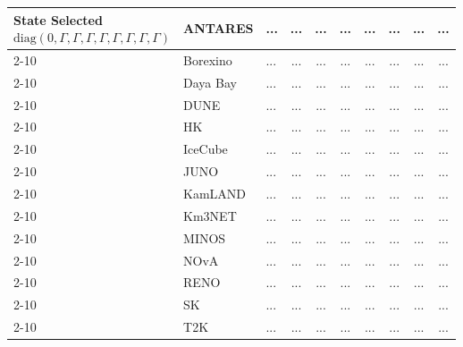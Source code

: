 \begin{table}[H]
{\begin{tabular}{|l|l|l||c|c|c|c|c|c|c|}
\multirow{13}{*}{\parbox{3.2cm}{\centering 
State Selected \\[0.5ex]
\scriptsize $\mathrm{diag}(0,\Gamma,\Gamma,\Gamma,\Gamma,\Gamma,\Gamma,\Gamma,\Gamma)$}}
        & ANTARES          & ... & ... & ... & ... & ... & ... & ... & ... \\ \cline{2-10}
        & Borexino         & ... & ... & ... & ... & ... & ... & ... & ... \\ \cline{2-10}
        & Daya Bay         & ... & ... & ... & ... & ... & ... & ... & ... \\ \cline{2-10}
        & DUNE             & ... & ... & ... & ... & ... & ... & ... & ... \\ \cline{2-10}
        & HK & ... & ... & ... & ... & ... & ... & ... & ... \\ \cline{2-10}
        & IceCube          & ... & ... & ... & ... & ... & ... & ... & ... \\ \cline{2-10}
        & JUNO             & ... & ... & ... & ... & ... & ... & ... & ... \\ \cline{2-10}
        & KamLAND          & ... & ... & ... & ... & ... & ... & ... & ... \\ \cline{2-10}
        & Km3NET           & ... & ... & ... & ... & ... & ... & ... & ... \\ \cline{2-10}
        & MINOS            & ... & ... & ... & ... & ... & ... & ... & ... \\ \cline{2-10}
        & NOvA             & ... & ... & ... & ... & ... & ... & ... & ... \\ \cline{2-10}
        & RENO             & ... & ... & ... & ... & ... & ... & ... & ... \\ \cline{2-10}
        & SK               & ... & ... & ... & ... & ... & ... & ... & ... \\ \cline{2-10}
        & T2K              & ... & ... & ... & ... & ... & ... & ... & ... \\ \hline \hline



\end{tabular}}
\end{table}
